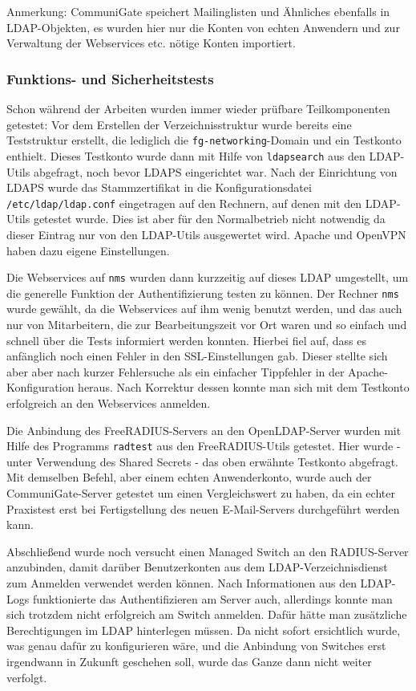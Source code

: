 \documentclass[11pt,a4paper,titlepage=firstiscover,headsepline,bibtotoc]{scrartcl} %
\begin{document}
Anmerkung: CommuniGate speichert Mailinglisten und Ähnliches ebenfalls in LDAP-Objekten, es wurden hier nur die Konten von echten Anwendern und zur Verwaltung der Webservices etc. nötige Konten importiert.

\subsubsection{Funktions- und Sicherheitstests}
Schon während der Arbeiten wurden immer wieder prüfbare Teilkomponenten getestet: 
Vor dem Erstellen der Verzeichnisstruktur wurde bereits eine Teststruktur erstellt, die lediglich die \texttt{fg-networking}-Domain und ein Testkonto enthielt. Dieses Testkonto wurde dann mit Hilfe von \texttt{ldapsearch} aus den LDAP-Utils abgefragt, noch bevor LDAPS eingerichtet war. Nach der Einrichtung von LDAPS wurde das Stammzertifikat in die Konfigurationsdatei \texttt{/etc/ldap/ldap.conf} eingetragen auf den Rechnern, auf denen mit den LDAP-Utils getestet wurde. Dies ist aber für den Normalbetrieb nicht notwendig da dieser Eintrag nur von den LDAP-Utils ausgewertet wird. Apache und OpenVPN haben dazu eigene Einstellungen.

Die Webservices auf \texttt{nms} wurden dann kurzzeitig auf dieses LDAP umgestellt, um die generelle Funktion der Authentifizierung testen zu können. Der Rechner \texttt{nms} wurde gewählt, da die Webservices auf ihm wenig benutzt werden, und das auch nur von Mitarbeitern, die zur Bearbeitungszeit vor Ort waren und so einfach und schnell über die Tests informiert werden konnten. Hierbei fiel auf, dass es anfänglich noch einen Fehler in den SSL-Einstellungen gab. Dieser stellte sich aber aber nach kurzer Fehlersuche als ein einfacher Tippfehler in der Apache-Konfiguration heraus. Nach Korrektur dessen konnte man sich mit dem Testkonto erfolgreich an den Webservices anmelden.

Die Anbindung des FreeRADIUS-Servers an den OpenLDAP-Server wurden mit Hilfe des Programms \texttt{radtest} aus den FreeRADIUS-Utils getestet. Hier wurde - unter Verwendung des Shared Secrets - das oben erwähnte Testkonto abgefragt. Mit demselben Befehl, aber einem echten Anwenderkonto, wurde auch der CommuniGate-Server getestet um einen Vergleichswert zu haben, da ein echter Praxistest erst bei Fertigstellung des neuen E-Mail-Servers durchgeführt werden kann.

Abschließend wurde noch versucht einen Managed Switch an den RADIUS-Server anzubinden, damit darüber Benutzerkonten aus dem LDAP-Verzeichnisdienst zum Anmelden verwendet werden können. Nach Informationen aus den LDAP-Logs funktionierte das Authentifizieren am Server auch, allerdings konnte man sich trotzdem nicht erfolgreich am Switch anmelden. Dafür hätte man zusätzliche Berechtigungen im LDAP hinterlegen müssen. Da nicht sofort ersichtlich wurde, was genau dafür zu konfigurieren wäre, und die Anbindung von Switches erst irgendwann in Zukunft geschehen soll, wurde das Ganze dann nicht weiter verfolgt.
\end{document}
